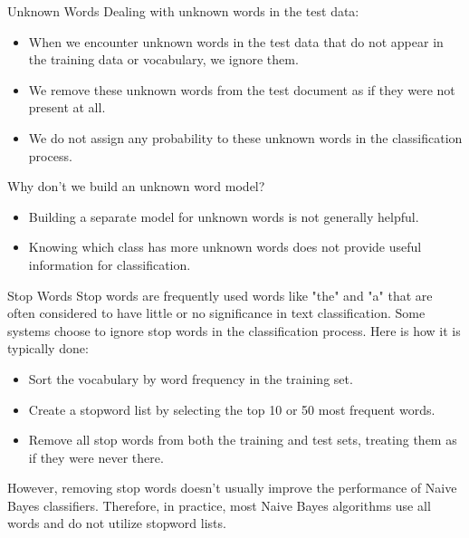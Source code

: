 \documentclass[handout]{beamer}
\begin{document}
\begin{frame}{Unknown Words}
\scriptsize
Dealing with unknown words in the test data:
\begin{itemize}
    \item When we encounter unknown words in the test data that do not appear in the training data or vocabulary, we ignore them.
    \item We remove these unknown words from the test document as if they were not present at all.
    \item We do not assign any probability to these unknown words in the classification process.
\end{itemize}

Why don't we build an unknown word model?
\begin{itemize}
    \item Building a separate model for unknown words is not generally helpful.
    \item Knowing which class has more unknown words does not provide useful information for classification.
\end{itemize}
\end{frame}

\begin{frame}{Stop Words}
\scriptsize
Stop words are frequently used words like "the" and "a" that are often considered to have little or no significance in text classification. Some systems choose to ignore stop words in the classification process. Here is how it is typically done:

\begin{itemize}
    \item Sort the vocabulary by word frequency in the training set.
    \item Create a stopword list by selecting the top 10 or 50 most frequent words.
    \item Remove all stop words from both the training and test sets, treating them as if they were never there.
\end{itemize}

However, removing stop words doesn't usually improve the performance of Naive Bayes classifiers. Therefore, in practice, most Naive Bayes algorithms use all words and do not utilize stopword lists.
\end{frame}
\end{document}
